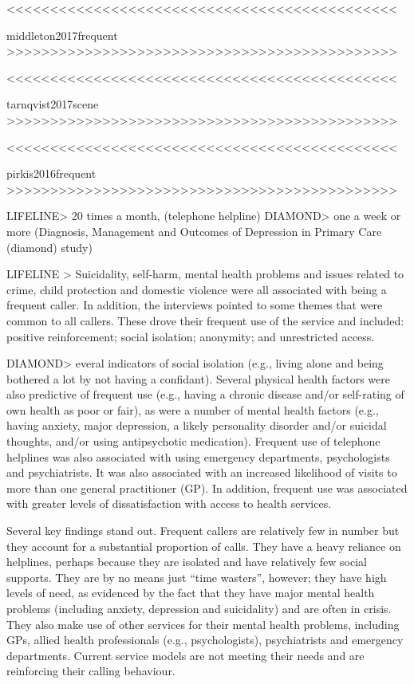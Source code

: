 <<<<<<<<<<<<<<<<<<<<<<<<<<<<<<<<<<<<<<<<<<<<<



middleton2017frequent
>>>>>>>>>>>>>>>>>>>>>>>>>>>>>>>>>>>>>>>>>>>>>



<<<<<<<<<<<<<<<<<<<<<<<<<<<<<<<<<<<<<<<<<<<<<


tarnqvist2017scene
>>>>>>>>>>>>>>>>>>>>>>>>>>>>>>>>>>>>>>>>>>>>>



<<<<<<<<<<<<<<<<<<<<<<<<<<<<<<<<<<<<<<<<<<<<<


pirkis2016frequent
>>>>>>>>>>>>>>>>>>>>>>>>>>>>>>>>>>>>>>>>>>>>>

LIFELINE>
20 times a month, (telephone helpline)
DIAMOND>
one a week or more (Diagnosis, Management and Outcomes of Depression in Primary Care (diamond) study)

LIFELINE >
Suicidality, self-harm, mental health problems and issues related to crime, child protection and domestic violence were all associated with being a frequent caller.
 In addition, the interviews pointed to some themes that were common to all callers. These drove their frequent use of the service and included: positive reinforcement; social isolation; anonymity; and unrestricted access.

DIAMOND>
everal indicators of social isolation (e.g., living alone and being bothered a lot by not having a confidant). Several physical health factors were also predictive of frequent use (e.g., having a chronic disease and/or self-rating of own health as poor or fair), as were a number of mental health factors (e.g., having anxiety, major depression, a likely personality disorder and/or suicidal thoughts, and/or using antipsychotic medication). Frequent use of telephone helplines was also associated with using emergency departments, psychologists and psychiatrists. It was also associated with an increased likelihood of visits to more than one general practitioner (GP). In addition, frequent use was associated with greater levels of dissatisfaction with access to health services.


Several key findings stand out. Frequent callers are relatively few in number but they account for a substantial proportion of calls. They have a heavy reliance on helplines, perhaps because they are isolated and have relatively few social supports. They are by no means just “time wasters”, however; they have high levels of need, as evidenced by the fact that they have major mental health problems (including anxiety, depression and suicidality) and are often in crisis. They also make use of other services for their mental health problems, including GPs, allied health professionals (e.g., psychologists), psychiatrists and emergency departments. Current service models are not meeting their needs and are reinforcing their calling behaviour.

